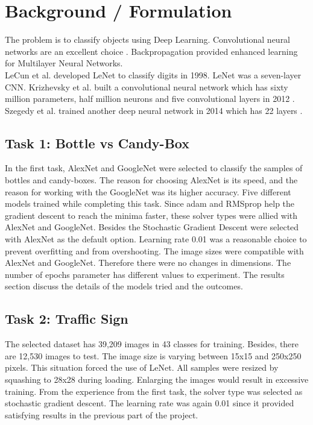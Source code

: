 \documentclass[10pt,journal,compsoc]{IEEEtran}
\begin{document}
\section{Background / Formulation}
The problem is to classify objects using Deep Learning. Convolutional neural networks are an excellent choice \cite{wiki:cnn}. Backpropagation provided enhanced learning for Multilayer Neural Networks.\\
LeCun et al. developed LeNet to classify digits in 1998\cite{lenet}. LeNet was a seven-layer CNN. Krizhevsky et al. built a convolutional neural network which has sixty million parameters, half million neurons and five convolutional layers in 2012 \cite{AlexNet}. Szegedy et al. trained another deep neural network in 2014 which has 22 layers \cite{gnet}.

\subsection{Task 1: Bottle vs Candy-Box}
In the first task, AlexNet and GoogleNet were selected to classify the samples of bottles and candy-boxes. The reason for choosing AlexNet is its speed, and the reason for working with the GoogleNet was its higher accuracy. Five different models trained while completing this task. Since adam and RMSprop help the gradient descent to reach the minima faster, these solver types were allied with AlexNet and GoogleNet. Besides the Stochastic Gradient Descent were selected with AlexNet as the default option. Learning rate 0.01 was a reasonable choice to prevent overfitting and from overshooting. The image sizes were compatible with AlexNet and GoogleNet. Therefore there were no changes in dimensions. The number of epochs parameter has different values to experiment. The results section discuss the details of the models tried and the outcomes.

\subsection{Task 2: Traffic Sign}
The selected dataset has 39,209 images in 43 classes for training. Besides, there are 12,530 images to test. The image size is varying between 15x15 and 250x250 pixels. This situation forced the use of LeNet. All samples were resized by squashing to 28x28 during loading. Enlarging the images would result in excessive training. From the experience from the first task, the solver type was selected as stochastic gradient descent. The learning rate was again 0.01 since it provided satisfying results in the previous part of the project.
\end{document}
